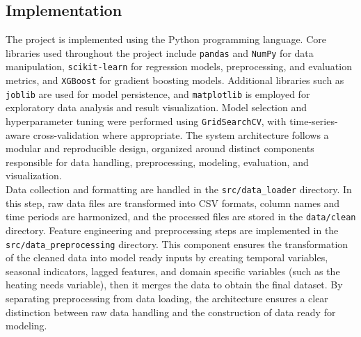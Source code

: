 \documentclass[11pt,a4paper]{article}
\begin{document}
\subsection{Implementation}

The project is implemented using the Python programming language. Core libraries used throughout the project include \texttt{pandas} and \texttt{NumPy} for data manipulation, \texttt{scikit-learn} for regression models, preprocessing, and evaluation metrics, and \texttt{XGBoost} for gradient boosting models. Additional libraries such as \texttt{joblib} are used for model persistence, and \texttt{matplotlib} is employed for exploratory data analysis and result visualization. Model selection and hyperparameter tuning were performed using \texttt{GridSearchCV}, with time-series-aware cross-validation where appropriate. The system architecture follows a modular and reproducible design, organized around distinct components responsible for data handling, preprocessing, modeling, evaluation, and visualization.\\

Data collection and formatting are handled in the \texttt{src/data\_loader} directory. In this step, raw data files are transformed into CSV formats, column names and time periods are harmonized, and the processed files are stored in the \texttt{data/clean} directory. Feature engineering and preprocessing steps are implemented in the \texttt{src/data\_preprocessing} directory. This component ensures the transformation of the cleaned data into model ready inputs by creating temporal variables, seasonal indicators, lagged features, and domain specific variables (such as the heating needs variable), then it merges the data to obtain the final dataset. By separating preprocessing from data loading, the architecture ensures a clear distinction between raw data handling and the construction of data ready for modeling.\\
\end{document}

